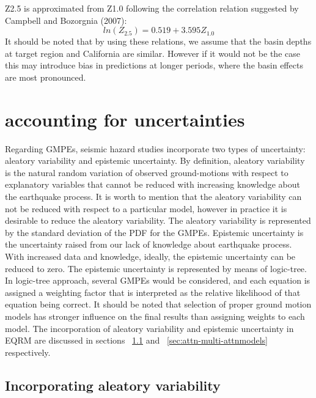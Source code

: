Z2.5 is approximated from Z1.0 following the correlation relation
suggested by Campbell and Bozorgnia (2007):
\begin{equation}
ln(Z_{2.5}) = 0.519+3.595Z_{1.0}
\end{equation}
It should be noted that by using these relations, we assume that the
basin depths at target region and California are similar. However if
it would not be the case this may introduce bias in predictions at
longer periods, where the basin effects are most pronounced.

\section{accounting for uncertainties}\label{sec:uncertain}
Regarding GMPEs, seismic hazard studies incorporate two types of
uncertainty: aleatory variability and epistemic uncertainty. By
definition, aleatory variability is the natural random variation of
observed ground-motions with respect to explanatory variables that
cannot be reduced with increasing knowledge about the earthquake
process. It is worth to mention that the aleatory variability can
not be reduced with respect to a particular model, however in
practice it is desirable to reduce the aleatory variability. The
aleatory variability is represented by the standard deviation of the
PDF for the GMPEs. Epistemic uncertainty is the uncertainty raised
from our lack of knowledge about earthquake process. With increased
data and knowledge, ideally, the epistemic uncertainty can be
reduced to zero. The epistemic uncertainty is represented by means
of logic-tree. In logic-tree approach, several GMPEs would be
considered, and each equation is assigned a weighting factor that is
interpreted as the relative likelihood of that equation being
correct. It should be noted that selection of proper ground motion
models has stronger influence on the final results than assigning
weights to each model. The incorporation of aleatory variability and
epistemic uncertainty in EQRM are discussed in sections
~\ref{attn:uncertainty} and ~\ref{sec:attn-multi-attnmodels}
respectively.
\subsection{Incorporating aleatory variability}
\label{attn:uncertainty}

